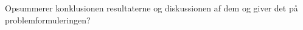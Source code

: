 Opsummerer konklusionen resultaterne og diskussionen af dem og giver det på problemformuleringen? \\